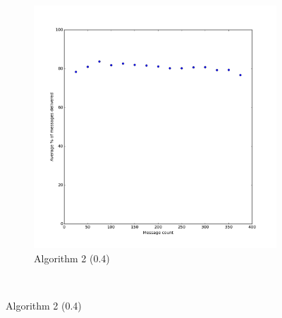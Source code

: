 \documentclass[bsc,frontabs,twoside,singlespacing,parskip,deptreport]{infthesis}     %
\begin{document}
\begin{figure}
\begin{subfigure}[b]{0.3\textwidth}
        \includegraphics[width=\textwidth]{results/Prob50Share_Prob40}
        \caption{Algorithm 2 (0.4)}
        \label{fig:results/Prob50Share_Prob40}
    \end{subfigure}
    ~ %
    

\end{figure}
\end{document}
